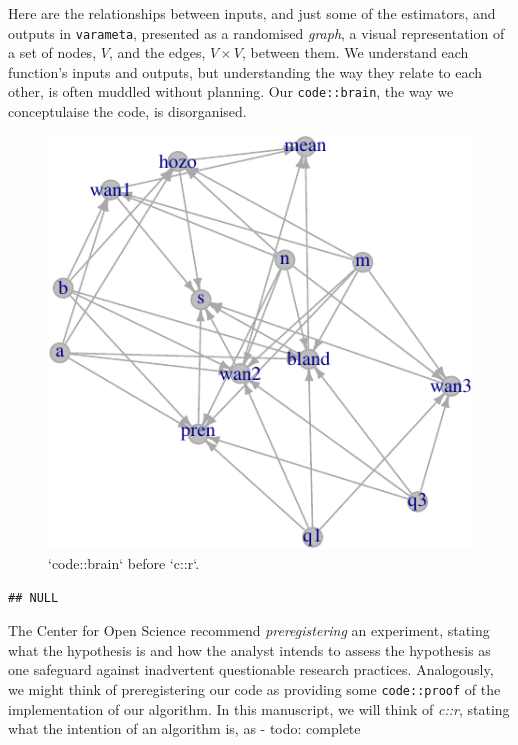 \documentclass[
]{article}
\begin{document}
Here are the relationships between inputs, and just some of the
estimators, and outputs in \texttt{varameta}, presented as a randomised
\emph{graph}, a visual representation of a set of nodes, \(V\), and the
edges, \(V \times V\), between them. We understand each function's
inputs and outputs, but understanding the way they relate to each other,
is often muddled without planning. Our \texttt{code::brain}, the way we
conceptulaise the code, is disorganised.

\begin{figure}

{\centering \includegraphics{when-is-done-done_files/figure-latex/codebrain-1} 

}

\caption{`code::brain` before `c::r`.}\label{fig:codebrain}
\end{figure}

\begin{verbatim}
## NULL
\end{verbatim}

The Center for Open Science recommend \emph{preregistering} an
experiment, stating what the hypothesis is and how the analyst intends
to assess the hypothesis as one safeguard against inadvertent
questionable research practices. Analogously, we might think of
preregistering our code as providing some \texttt{code::proof} of the
implementation of our algorithm. In this manuscript, we will think of
\emph{c::r}, stating what the intention of an algorithm is, as - todo:
complete
\end{document}

